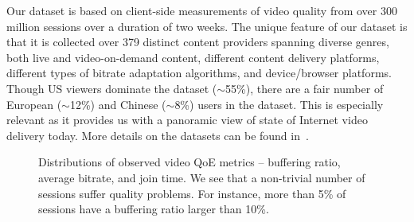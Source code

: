 Our dataset is based on client-side measurements of
video  quality from over 300 million sessions over a duration
of two weeks. The unique feature of our dataset is that it is 
collected over 379 distinct content providers spanning diverse 
genres, both live and video-on-demand content, different 
content delivery platforms, different types of  bitrate adaptation 
algorithms, and device/browser platforms. 
Though US viewers dominate the dataset ($\sim$55\%), 
there are a fair number of European ($\sim$12\%) and 
Chinese ($\sim$8\%) users in the dataset.
This is especially relevant as it provides us with a panoramic 
view   of state of  Internet video delivery today.
More details on the datasets can be found in~\cite{jiang2013shedding}.

\begin{figure}[t]
\centering
\captionsetup[subfigure]{justification=centering,farskip=-1pt,captionskip=5pt}
\caption{Distributions of observed video QoE metrics -- 
buffering ratio, average bitrate, and join time. 
 We see that a non-trivial number of sessions suffer quality problems. 
 For instance, more than 5\% of sessions have a buffering ratio larger
  than 10\%.  }
\label{fig:overview:qualitycdf}
\end{figure}

